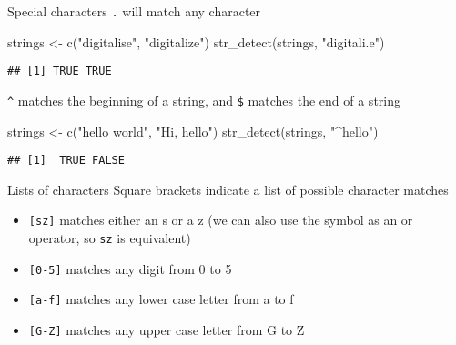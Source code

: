 \documentclass[
  10pt,
  ignorenonframetext,
  aspectratio=169]{beamer}
\newenvironment{Shaded}{\begin{snugshade}}{\end{snugshade}}
\newcommand{\FunctionTok}[1]{\textcolor[rgb]{0.94,0.94,0.56}{#1}}
\newcommand{\NormalTok}[1]{\textcolor[rgb]{0.80,0.80,0.80}{#1}}
\newcommand{\OtherTok}[1]{\textcolor[rgb]{0.94,0.94,0.56}{#1}}
\newcommand{\StringTok}[1]{\textcolor[rgb]{0.80,0.58,0.58}{#1}}
\providecommand{\tightlist}{%
  \setlength{\itemsep}{0pt}\setlength{\parskip}{0pt}}
\begin{document}
\begin{frame}[fragile]{Special characters}
\protect\hypertarget{special-characters}{}
\texttt{.} will match any character

\scriptsize

\begin{Shaded}
\begin{Highlighting}[]
\NormalTok{strings }\OtherTok{\textless{}{-}} \FunctionTok{c}\NormalTok{(}\StringTok{"digitalise"}\NormalTok{, }\StringTok{"digitalize"}\NormalTok{)}
\FunctionTok{str\_detect}\NormalTok{(strings, }\StringTok{"digitali.e"}\NormalTok{)}
\end{Highlighting}
\end{Shaded}

\begin{verbatim}
## [1] TRUE TRUE
\end{verbatim}

\normalsize

\texttt{\^{}} matches the beginning of a string, and \texttt{\$} matches
the end of a string

\normalsize

\begin{Shaded}
\begin{Highlighting}[]
\NormalTok{strings }\OtherTok{\textless{}{-}} \FunctionTok{c}\NormalTok{(}\StringTok{"hello world"}\NormalTok{, }\StringTok{"Hi, hello"}\NormalTok{)}
\FunctionTok{str\_detect}\NormalTok{(strings, }\StringTok{"\^{}hello"}\NormalTok{)}
\end{Highlighting}
\end{Shaded}

\begin{verbatim}
## [1]  TRUE FALSE
\end{verbatim}
\end{frame}

\begin{frame}[fragile]{Lists of characters}
\protect\hypertarget{lists-of-characters}{}
Square brackets indicate a list of possible character matches

\begin{itemize}
\tightlist
\item
  \texttt{{[}sz{]}} matches either an s or a z (we can also use the
  \texttt{\textbar{}} symbol as an or operator, so \texttt{s\textbar{}z}
  is equivalent)
\item
  \texttt{{[}0-5{]}} matches any digit from 0 to 5
\item
  \texttt{{[}a-f{]}} matches any lower case letter from a to f
\item
  \texttt{{[}G-Z{]}} matches any upper case letter from G to Z
\end{itemize}
\end{frame}
\end{document}
